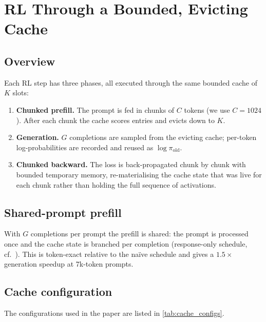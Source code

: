 \section{RL Through a Bounded, Evicting Cache}
\label{sec:method}


\subsection{Overview}
Each RL step has three phases, all executed through the same bounded cache of
$K$ slots:
\begin{enumerate}
  \item \textbf{Chunked prefill.} The prompt is fed in chunks of $C$ tokens
    (we use $C=1024$). After each chunk the cache scores entries and evicts
    down to $K$.
  \item \textbf{Generation.} $G$ completions are sampled from the evicting
    cache; per-token log-probabilities are recorded and reused as
    $\log\pi_{\text{old}}$.
  \item \textbf{Chunked backward.} The loss is back-propagated chunk by chunk
    with bounded temporary memory, re-materialising the cache state that was
    live for each chunk rather than holding the full sequence of activations.
\end{enumerate}

\subsection{Shared-prompt prefill}
With $G$ completions per prompt the prefill is shared: the prompt is
processed once and the cache state is branched per completion
(response-only schedule, cf.\ ). This is token-exact
relative to the na\"ive schedule and gives a $1.5\times$ generation speedup at
7k-token prompts.

\subsection{Cache configuration}
 The configurations used in the paper are listed in
\cref{tab:cache_configs}.

